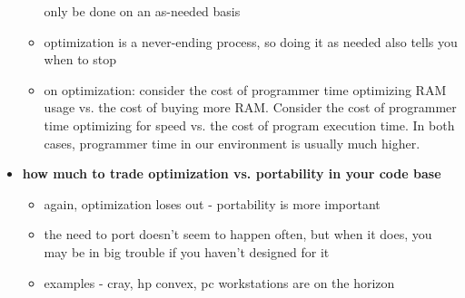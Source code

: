 \begin{itemize}
\begin{itemize}
			only be done on an as-needed basis
	\item optimization is a never-ending process, so doing it as needed also 
			tells you when to stop
	\item on optimization:  consider the cost of programmer	time optimizing
			RAM usage vs. the cost of buying more RAM.  Consider the cost of 
			programmer time optimizing for speed vs. the cost of program 
			execution time.  In both cases, programmer time in our environment
			is usually much higher.
	\end{itemize}
\item {\bf how much to trade optimization vs. portability in your code base}
	\begin{itemize}
	\item again, optimization loses out - portability is more important
	\item the need to port doesn't seem to happen often, but when it does, you
			may be in big trouble if you haven't designed for it
	\item examples - cray, hp convex, pc workstations are on the horizon
	\end{itemize}
\end{itemize}

\pagebreak
